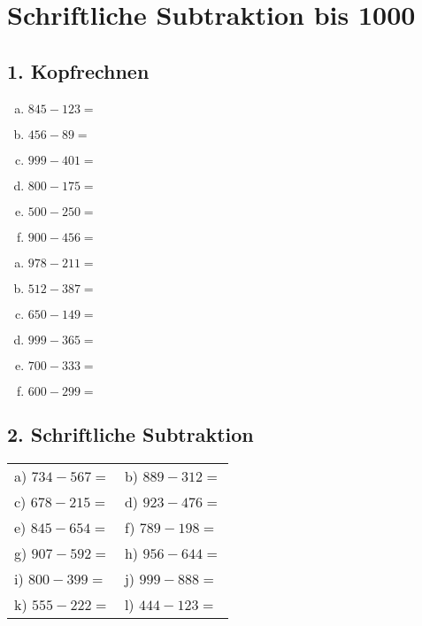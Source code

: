 
\section*{Schriftliche Subtraktion bis 1000}

\subsection*{1. Kopfrechnen}
\noindent
\begin{minipage}{0.48\textwidth}
\begin{enumerate}[a)]
    \item $845 - 123 =$ 
    \item $456 - 89 =$ 
    \item $999 - 401 =$ 
    \item $800 - 175 =$ 
    \item $500 - 250 =$ 
    \item $900 - 456 =$ 
\end{enumerate}
\end{minipage}
\hfill
\begin{minipage}{0.48\textwidth}
\begin{enumerate}[a),start=7]
    \item $978 - 211 =$ 
    \item $512 - 387 =$ 
    \item $650 - 149 =$ 
    \item $999 - 365 =$ 
    \item $700 - 333 =$ 
    \item $600 - 299 =$ 
\end{enumerate}
\end{minipage}

\vspace{0.5cm}

\subsection*{2. Schriftliche Subtraktion}
\noindent
\begin{tabular}{p{} p{}}
 a) $734 - 567 =$ & b) $889 - 312 =$ \\
 c) $678 - 215 =$ & d) $923 - 476 =$ \\
 e) $845 - 654 =$ & f) $789 - 198 =$ \\
 g) $907 - 592 =$ & h) $956 - 644 =$ \\
 i) $800 - 399 =$ & j) $999 - 888 =$ \\
 k) $555 - 222 =$ & l) $444 - 123 =$ \\
\end{tabular}

